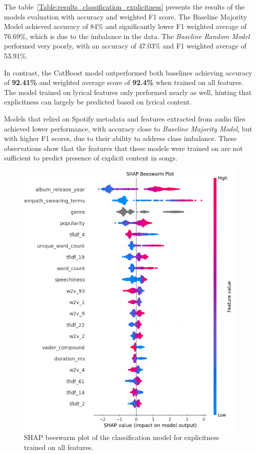 The table~\ref{Table:results_classification_explicitness} presents the
results of the models evaluation with accuracy and weighted F1 score. The
Baseline Majority Model achieved accuracy of 84\% and significantly lower F1
weighted average of 76.69\%, which is due to the imbalance in the data. The
\textit{Baseline Random Model} performed very poorly, with an accuracy of
47.03\% and F1 weighted average of 53.91\%.

In contrast, the CatBoost model outperformed both baselines achieving accuracy
of \textbf{92.41\%} and weighted average score of \textbf{92.4\%} when trained
on all features. The model trained on lyrical features only performed nearly as
well, hinting that explicitness can largely be predicted based on lyrical
content. 

Models that relied on Spotify metadata and features extracted from
audio files achieved lower performance, with accuracy close to \textit{Baseline
Majority Model}, but with higher F1 scores, due to their ability to address
class imbalance. These observations show that the features that these models
were trained on are not sufficient to predict presence of explicit content
in songs.


\begin{center}
\begin{figure}[H]
  \centering
  \includegraphics[width=6in]{img/beeswarm_explicitness.png}
  \caption{SHAP beeswarm plot of the classification model for explicitness
  trained on all features.}
  \label{Figure:beeswarm_explicitness}
\end{figure}
\end{center}

